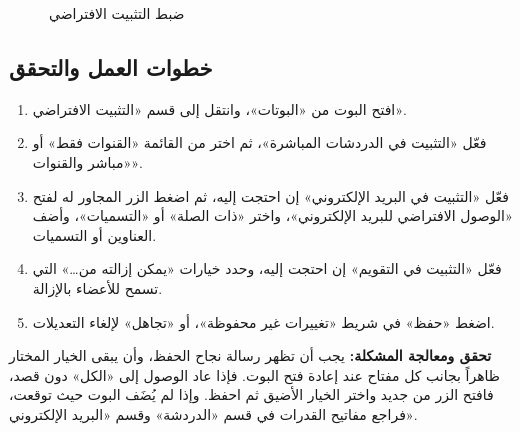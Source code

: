 \begin{figure}[H]
\centering
{}
\rclegend
\caption{ضبط التثبيت الافتراضي}
\label{fig:builder-bots-default-installation-flow}
\end{figure}

\subsection{خطوات العمل والتحقق}
\begin{enumerate}
\item افتح البوت من «البوتات»، وانتقل إلى قسم «التثبيت الافتراضي».
\item فعّل «التثبيت في الدردشات المباشرة»، ثم اختر من القائمة «القنوات فقط» أو «مباشر والقنوات».
\item فعّل «التثبيت في البريد الإلكتروني» إن احتجت إليه، ثم اضغط الزر المجاور له لفتح «الوصول الافتراضي للبريد الإلكتروني»، واختر «ذات الصلة» أو «التسميات»، وأضف العناوين أو التسميات.
\item فعّل «التثبيت في التقويم» إن احتجت إليه، وحدد خيارات «يمكن إزالته من…» التي تسمح للأعضاء بالإزالة.
\item اضغط «حفظ» في شريط «تغييرات غير محفوظة»، أو «تجاهل» لإلغاء التعديلات.
\end{enumerate}

\textbf{تحقق ومعالجة المشكلة:} يجب أن تظهر رسالة نجاح الحفظ، وأن يبقى الخيار المختار ظاهراً بجانب كل مفتاح عند إعادة فتح البوت. فإذا عاد الوصول إلى «الكل» دون قصد، فافتح الزر من جديد واختر الخيار الأضيق ثم احفظ. وإذا لم يُضَف البوت حيث توقعت، فراجع مفاتيح القدرات في قسم «الدردشة» وقسم «البريد الإلكتروني».

